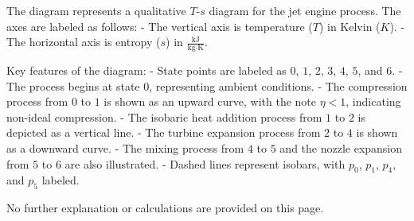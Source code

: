 The diagram represents a qualitative \( T \)-\( s \) diagram for the jet engine process. The axes are labeled as follows:  
- The vertical axis is temperature (\( T \)) in Kelvin (\( K \)).  
- The horizontal axis is entropy (\( s \)) in \( \frac{\text{kJ}}{\text{kg·K}} \).  

Key features of the diagram:  
- State points are labeled as \( 0 \), \( 1 \), \( 2 \), \( 3 \), \( 4 \), \( 5 \), and \( 6 \).  
- The process begins at state \( 0 \), representing ambient conditions.  
- The compression process from \( 0 \) to \( 1 \) is shown as an upward curve, with the note \( \eta < 1 \), indicating non-ideal compression.  
- The isobaric heat addition process from \( 1 \) to \( 2 \) is depicted as a vertical line.  
- The turbine expansion process from \( 2 \) to \( 4 \) is shown as a downward curve.  
- The mixing process from \( 4 \) to \( 5 \) and the nozzle expansion from \( 5 \) to \( 6 \) are also illustrated.  
- Dashed lines represent isobars, with \( p_0 \), \( p_1 \), \( p_4 \), and \( p_5 \) labeled.  

No further explanation or calculations are provided on this page.